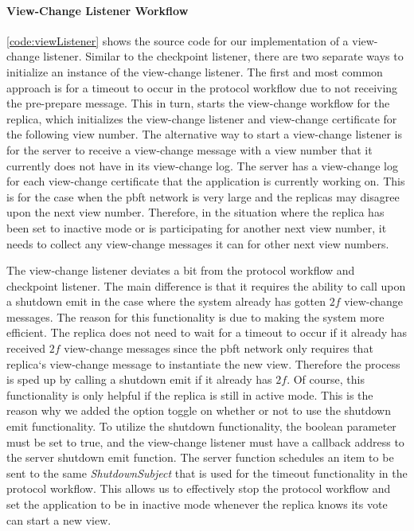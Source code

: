 \paragraph{View-Change Listener Workflow}
\label{sec:viewchangeListener}
\autoref{code:viewListener} shows the source code for our implementation of a view-change listener. Similar to the checkpoint listener, there are two separate ways to initialize an instance of the view-change listener. The first and most common approach is for a timeout to occur in the protocol workflow due to not receiving the pre-prepare message. This in turn, starts the view-change workflow for the replica, which initializes the view-change listener and view-change certificate for the following view number. The alternative way to start a view-change listener is for the server to receive a view-change message with a view number that it currently does not have in its view-change log. The server has a view-change log for each view-change certificate that the application is currently working on. This is for the case when the \ac{pbft} network is very large and the replicas may disagree upon the next view number. Therefore, in the situation where the replica has been set to inactive mode or is participating for another next view number, it needs to collect any view-change messages it can for other next view numbers.

The view-change listener deviates a bit from the protocol workflow and checkpoint listener. The main difference is that it requires the ability to call upon a shutdown emit in the case where the system already has gotten $2f$ view-change messages. The reason for this functionality is due to making the system more efficient. The replica does not need to wait for a timeout to occur if it already has received $2f$ view-change messages since the \ac{pbft} network only requires that replica`s view-change message to instantiate the new view. Therefore the process is sped up by calling a shutdown emit if it already has $2f$. Of course, this functionality is only helpful if the replica is still in active mode. This is the reason why we added the option toggle on whether or not to use the shutdown emit functionality. To utilize the shutdown functionality, the boolean parameter  must be set to true, and the view-change listener must have a callback address to the server shutdown emit function. The server function schedules an item to be sent to the same  \emph{ShutdownSubject} that is used for the timeout functionality in the protocol workflow. This allows us to effectively stop the protocol workflow and set the application to be in inactive mode whenever the replica knows its vote can start a new view. 

